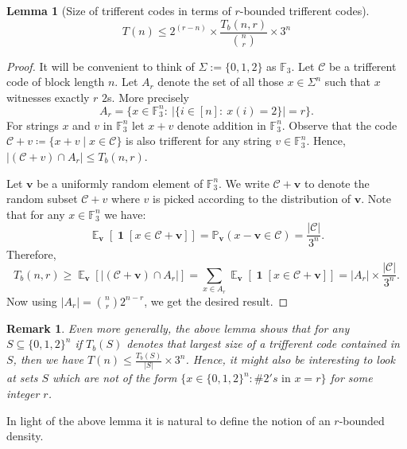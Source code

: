 \documentclass[10pt,a4paper]{article}
\newcommand{\rbdtrifferentcodes}{$r$-bounded trifferent code}
\newcommand{\F}{\mathbb{F}}
\newcommand{\calC}{\mathcal{C}}
\newcommand{\set}[1]{\{#1\}}
\renewcommand{\Vec}[1]{\mathbf{#1}}
\newtheorem{lemma}[theorem]{Lemma}
\newtheorem{remark}[theorem]{Remark}
\DeclareMathOperator*{\E}{\mathbb{E}}
\DeclareMathOperator{\1}{\mathbf{1}}
\begin{document}
\begin{lemma}[Size of trifferent codes in terms of \rbdtrifferentcodes{s}]
\label{lem:size_relation_triff_rbdtriff}
	$$T(n)\leq 2^{(r-n)} \times \frac{T_b(n,r)}{\displaystyle \binom{n}{r}} \times 3^n$$
\end{lemma}
\begin{proof}
	It will be convenient to think of $\Sigma := \set{0, 1, 2}$ as $\F_3$.
	Let $\calC$ be a trifferent code of block length $n$.
	Let $A_r$ denote the set of all those $x\in \Sigma^n$ such that $x$ witnesses exactly $r$ $2$s.
	More precisely
\begin{equation*}
		A_r = \set{x\in \F_3^n:\ |\set{i\in [n]:\ x(i) = 2}| = r}.
	\end{equation*}
    For strings $x$ and $v$ in $\F_3^n$ let $x+v$ denote addition in $\F_3^n$.
Observe that the code $\calC+v \coloneqq \set{x+v \mid x\in \calC }$ is also trifferent for any string $v\in \F_3^n$. Hence,   $|(\calC+v)\cap A_r|\leq T_b(n, r)$. 

	Let $\mathbf v$ be a uniformly random element of $\F_3^n$.
	We write $\calC+\Vec{v}$ to denote the random subset $\calC + {v}$ where $v$ is picked according to the distribution of $\Vec{v}$.
	Note that for any $x\in \F_3^n$ we have:
\begin{equation*}
		\E_{\mathbf v}[\1[x\in \calC + \Vec{v}]]
            = \mathbb P_{\mathbf v}(x - \mathbf v \in \mathcal C)
            =\frac{|\calC|}{3^n}.
	\end{equation*}
	Therefore,
\begin{equation*}
		T_b(n, r)
		\geq \E_{\mathbf v}[|(\calC + \Vec{v})\cap A_r|]
		= \sum_{x\in A_r} \E_{\mathbf v} [\1[x \in \calC + \Vec{v} ]] = |A_r|\times\frac{|\mathcal C|}{3^n}.
	\end{equation*}
	Now using $|A_r| = \binom{n}{r} 2^{n-r}$, we get the desired result.
\end{proof}

\begin{remark}
    Even more generally, the above lemma shows that for any $S\subseteq\set{0,1,2}^n$ if $T_b(S)$ denotes that largest size of a trifferent code contained in $S$, then we have $T(n)\leq \frac{T_b(S)}{|S|} \times 3^n$.
	Hence, it might also be interesting to look at sets $S$ which are not of the form $\set{x\in \set{0,1,2}^n \colon \#2's \text{ in } x= r}$ for some integer $r$.
\end{remark}

In light of the above lemma it is natural to define the notion of an $r$-bounded density.
\end{document}
